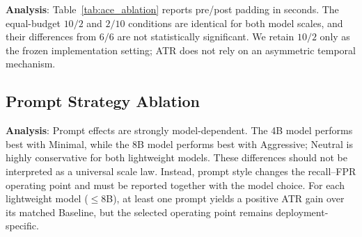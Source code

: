\textbf{Analysis}:
Table~\ref{tab:ace_ablation} reports pre/post padding in seconds. The equal-budget $10/2$ and $2/10$ conditions are identical for both model scales, and their differences from $6/6$ are not statistically significant. We retain $10/2$ only as the frozen implementation setting; ATR does not rely on an asymmetric temporal mechanism.


\subsection{Prompt Strategy Ablation}
\label{sec:prompt_ablation}

\begin{table}[h]
  \centering
  \caption{Prompt strategy ablation (ATR, full 1900-video evaluation).}
  \label{tab:prompt_ablation}
\end{table}

\textbf{Analysis}: Prompt effects are strongly model-dependent. The 4B model performs best with Minimal, while the 8B model performs best with Aggressive; Neutral is highly conservative for both lightweight models. These differences should not be interpreted as a universal scale law. Instead, prompt style changes the recall--FPR operating point and must be reported together with the model choice. For each lightweight model ($\leq$8B), at least one prompt yields a positive ATR gain over its matched Baseline, but the selected operating point remains deployment-specific.

